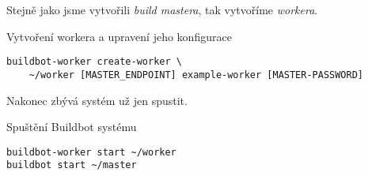 Stejně jako jsme vytvořili \textit{build mastera}, tak vytvoříme \textit{workera}.

\begin{listing}[ht]
\caption{Vytvoření workera a upravení jeho konfigurace}
\begin{verbatim}
buildbot-worker create-worker \
    ~/worker [MASTER_ENDPOINT] example-worker [MASTER-PASSWORD]
\end{verbatim}
\end{listing}

Nakonec zbývá systém už jen spustit.

\begin{listing}[ht]
\caption{Spuštění Buildbot systému}
\begin{verbatim}
buildbot-worker start ~/worker
buildbot start ~/master
\end{verbatim}
\end{listing}
